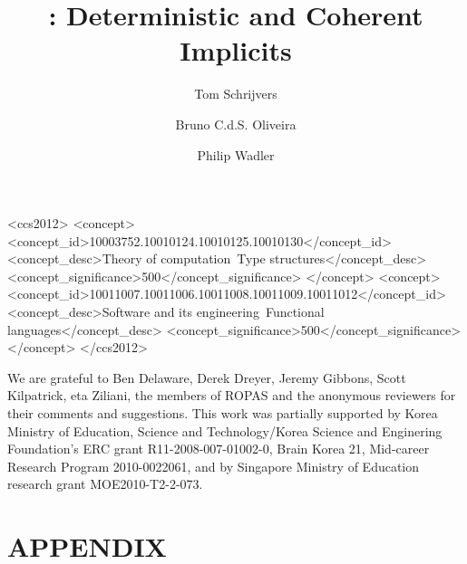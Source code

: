 \documentclass[acmlarge, authorname]{acmart}
\begin{document}
\title{\name: Deterministic and Coherent Implicits}
\author{Tom Schrijvers}
\author{Bruno C.d.S. Oliveira}
\author{Philip Wadler}


\begin{abstract}

\end{abstract}
\begin{CCSXML}
<ccs2012>
<concept>
<concept_id>10003752.10010124.10010125.10010130</concept_id>
<concept_desc>Theory of computation~Type structures</concept_desc>
<concept_significance>500</concept_significance>
</concept>
<concept>
<concept_id>10011007.10011006.10011008.10011009.10011012</concept_id>
<concept_desc>Software and its engineering~Functional languages</concept_desc>
<concept_significance>500</concept_significance>
</concept>
</ccs2012>
\end{CCSXML}


\maketitle











%








\begin{acks}
We are grateful to Ben Delaware, Derek Dreyer, Jeremy Gibbons, Scott
Kilpatrick, eta Ziliani, the members of ROPAS and the
anonymous reviewers for their comments and suggestions.  This work was
partially supported by Korea Ministry of Education, Science and
Technology/Korea Science and Enginering Foundation's ERC grant
R11-2008-007-01002-0, Brain Korea 21, Mid-career Research Program 2010-0022061, and
by Singapore Ministry of Education research grant MOE2010-T2-2-073.
\end{acks}

\newpage


\newpage
\appendix
\section*{APPENDIX}
\setcounter{section}{1}





\end{document}
